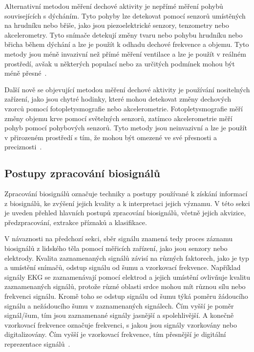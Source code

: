 Alternativní metodou měření dechové aktivity je nepřímé měření pohybů
souvisejících s dýcháním. Tyto pohyby lze detekovat pomocí senzorů umístěných na
hrudníku nebo břiše, jako jsou piezoelektrické senzory, tenzometry nebo
akcelerometry. Tyto snímače detekují změny tvaru nebo pohybu hrudníku nebo
břicha během dýchání a lze je použít k odhadu dechové frekvence a objemu. Tyto
metody jsou méně invazivní než přímé měření ventilace a lze je použít v reálném
prostředí, avšak u některých populací nebo za určitých podmínek mohou být méně
přesné~\cite{Massaroni2019,Massaroni2021,Fazio2021,Liu2019}.

Další nově se objevující metodou měření dechové aktivity je používání
nositelných zařízení, jako jsou chytré hodinky, které mohou detekovat změny
dechových vzorců pomocí fotopletysmografie nebo akcelerometrie.
Fotopletysmografie měří změny objemu krve pomocí světelných senzorů, zatímco
akcelerometrie měří pohyb pomocí pohybových senzorů. Tyto metody jsou
neinvazivní a lze je použít v přirozeném prostředí s tím, že mohou být omezené
ve své přesnosti a preciznosti~\cite{Massaroni2019,Massaroni2021,Fazio2021,
Leube2020,Liu2019,Nam2022,Zschocke2022}. 

\subsection{Postupy zpracování biosignálů}
\label{subsec:postupy_zpracovani_biosignalu}
Zpracování biosignálů označuje techniky a postupy používané k získání informací
z biosignálů, ke zvýšení jejich kvality a k interpretaci jejich významu. V této
sekci je uveden přehled hlavních postupů zpracování biosignálů, včetně jejich
akvizice, předzpracování, extrakce příznaků a klasifikace. 

V návaznosti na předchozí sekci, sběr signálu znamená tedy proces záznamu
biosignálů z lidského těla pomocí měřicích zařízení, jako jsou senzory nebo
elektrody. Kvalita zaznamenaných signálů závisí na různých faktorech, jako je
typ a umístění snímačů, odstup signálu od šumu a vzorkovací frekvence. Například
signály EKG se zaznamenávají pomocí elektrod a jejich umístění ovlivňuje kvalitu
zaznamenaných signálů, protože různé oblasti srdce mohou mít různou sílu nebo
frekvenci signálu. Kromě toho se odstup signálu od šumu týká poměru žádoucího
signálu a nežádoucího šumu v zaznamenaných signálech. Čím vyšší je poměr
signál/šum, tím jsou zaznamenané signály jasnější a spolehlivější. A konečně
vzorkovací frekvence označuje frekvenci, s jakou jsou signály vzorkovány nebo
digitalizovány. Čím vyšší je vzorkovací frekvence, tím přesnější je digitální
reprezentace signálů~\cite{Escabi2005,Karagiannis2011}.

